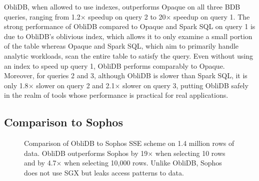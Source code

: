 \documentclass[letterpaper,twocolumn,10pt]{article}
\newcommand{\ignore}[1]{}
\def\name/{ObliDB}
\begin{document}
\name/, when allowed to use indexes, outperforms Opaque on all three BDB queries, ranging from 1.2$\times$ speedup on query 2 to 20$\times$ speedup on query 1. The strong performance of \name/ compared to Opaque and Spark SQL on query 1 is due to \name/'s oblivious index, which allows it to only examine a small portion of the table whereas Opaque and Spark SQL, which aim to primarily handle analytic workloads, scan the entire table to satisfy the query. Even without using an index to speed up query 1, \name/ performs comparably to Opaque. Moreover, for queries 2 and 3, although \name/ is slower than Spark SQL, it is only 1.8$\times$ slower on query 2 and 2.1$\times$ slower on query 3, putting \name/ safely in the realm of tools whose performance is practical for real applications. 

\subsection{Comparison to Sophos}
\begin{figure}
\small
\centering
{}
\caption{Comparison of \name/ to Sophos SSE scheme\cite{Bost16} on 1.4 million rows of data. \name/ outperforms Sophos by 19$\times$ when selecting 10 rows and by 4.7$\times$ when selecting 10,000 rows. Unlike \name/, Sophos does not use SGX but leaks access patterns to data.\ignore{make sure to mention in text that sophos numbers come from original paper and were gathered on a much more powerful computer and also used multithreading. Also, if we extrapolate the numbers to 100k rows retrieved, \name/ linear scan actual beats both \name/ index and sophos}} 
\label{figSophos}
\end{figure}
\end{document}
